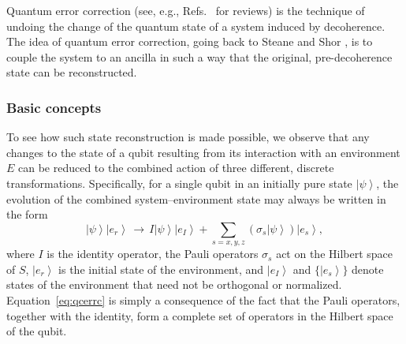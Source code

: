 \documentclass[3p,sort&compress,12pt]{elsarticle}
\newcommand{\ket}[1]{\left\vert{#1}\right\rangle}
\newcommand{\op}[1]{#1}
\begin{document}
Quantum error correction (see, e.g., Refs.~\cite{Steane:2001:dx,Knill:2002:rx,Nielsen:2000:tt,Gaitan:2008:uu,Lidar:2013:pp} for reviews) is the technique of undoing the change of the quantum state of a system induced by decoherence. The idea of quantum error correction, going back to Steane \cite{Steane:1996:cd} and Shor \cite{Shor:1995:rx}, is to couple the system to an ancilla in such a way that the original, pre-decoherence state can be reconstructed.

\subsubsection{Basic concepts}

To see how such state reconstruction is made possible, we observe that any changes to the state of a qubit resulting from its interaction with an environment $E$ can be reduced to the combined action of three different, discrete transformations. Specifically, for a single qubit in an initially pure state $\ket{\psi}$, the evolution of the combined system--environment state may always be written in the form \cite{Steane:2001:dx,Knill:2002:rx,Nielsen:2000:tt,Schlosshauer:2007:un}
%
\begin{equation} \label{eq:qcerrc} 
\ket{\psi} \ket{e_r}  \, \longrightarrow \, I
  \ket{\psi} \ket{e_I} + \sum_{s= x,y,z }
  \left( \sigma_s \ket{\psi} \right)
  \ket{e_s},
\end{equation}
%
where $\op{I}$ is the identity operator, the Pauli operators $\sigma_s$ act on the Hilbert space of $S$, $\ket{e_r}$ is the initial state of the environment, and $\ket{e_I}$ and $\{ \ket{e_s} \}$ denote states of the environment that need not be orthogonal or normalized. Equation~\eqref{eq:qcerrc} is simply a consequence of the fact that the Pauli operators, together with the identity, form a complete set of operators in the Hilbert space of the qubit. 
\end{document}
